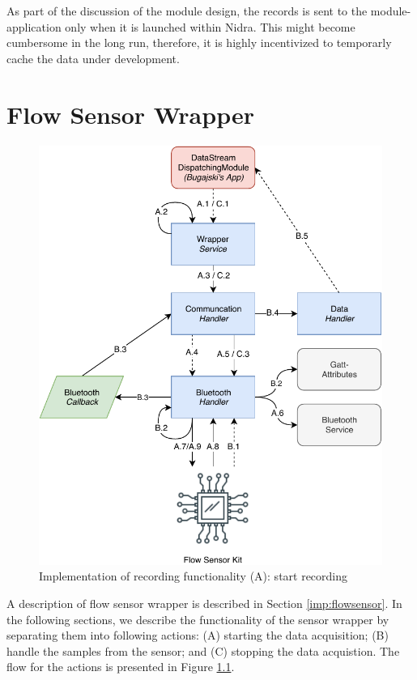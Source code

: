 As part of the discussion of the module design, the records is sent to the module-application only when it is launched within Nidra. This might become cumbersome in the long run, therefore, it is highly incentivized to temporarly cache the data under development. 


\chapter{Flow Sensor Wrapper}

\begin{figure}[!h]
    \centering
    \includegraphics[scale=0.7]{images/Flow_Imp.pdf}
    \caption{Implementation of recording functionality (A): start recording}
    \label{fig:impl_flowsensor}
\end{figure}

A description of flow sensor wrapper is described in Section \ref{imp:flowsensor}. In the following sections, we describe the functionality of the sensor wrapper by separating them into following actions: (A) starting the data acquisition; (B) handle the samples from the sensor; and (C) stopping the data acquistion. The flow for the actions is presented in Figure \ref{fig:impl_flowsensor}.

